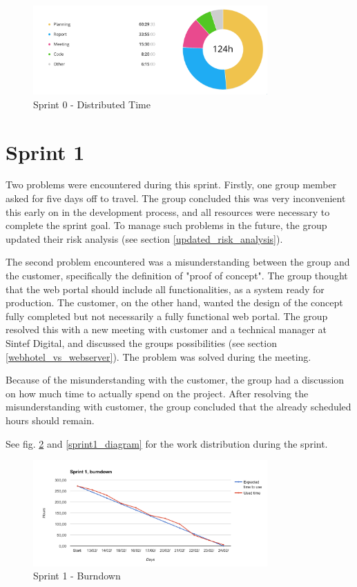 \begin{figure}[ht]
\centering
    \includegraphics[width=0.8\textwidth]{fig/sprint0-diagram}
\caption{Sprint 0 - Distributed Time}
\label{sprint0_diagram}
\end{figure}

\section{Sprint 1}
\label{Sprints-sprint1}
Two problems were encountered during this sprint. Firstly, one group member asked for five days off to travel. The group concluded this was very inconvenient this early on in the development process, and all resources were necessary to complete the sprint goal. To manage such problems in the future, the group updated their risk analysis (see section \ref{updated_risk_analysis}). 

The second problem encountered was a misunderstanding between the group and the customer, specifically the definition of "proof of concept". The group thought that the web portal should include all functionalities, as a system ready for production. The customer, on the other hand, wanted the design of the concept fully completed but not necessarily a fully functional web portal. The group resolved this with a new meeting with customer and a technical manager at Sintef Digital, and discussed the groups possibilities (see section \ref{webhotel_vs_webserver}). The problem was solved during the meeting.

Because of the misunderstanding with the customer, the group had a discussion on how much time to actually spend on the project. After resolving the misunderstanding with customer, the group concluded that the already scheduled hours should remain.

See fig. \ref{sprint1_burndown} and \ref{sprint1_diagram} for the work distribution during the sprint.

\begin{figure}[ht]
\centering
    \includegraphics[width=0.8\textwidth]{fig/sprint1}
\caption{Sprint 1 - Burndown}
\label{sprint1_burndown}
\end{figure}

